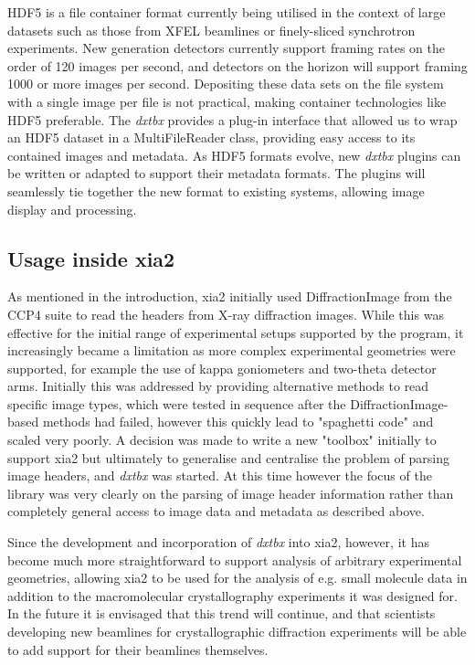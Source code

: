 \documentclass[preprint]{iucr}
\newcommand{\dxtbx}{\emph{dxtbx}\xspace}
\begin{document}
HDF5 is a file container format currently being utilised in the context of large 
datasets such as those from XFEL beamlines or finely-sliced synchrotron 
experiments. New generation detectors currently support framing rates on the 
order of 120 images per second, and detectors on the horizon will support 
framing 1000 or more images per second. Depositing these data sets on the file 
system with a single image per file is not practical, making container 
technologies like HDF5 preferable. The \dxtbx provides a plug-in interface that 
allowed us to wrap an HDF5 dataset in a MultiFileReader class, providing easy 
access to its contained images and metadata. As HDF5 formats evolve, new \dxtbx 
plugins can be written or adapted to support their metadata formats. The 
plugins will seamlessly tie together the new format to existing systems, 
allowing image display and processing.

\subsection{Usage inside xia2}
 
As mentioned in the introduction, xia2 initially used DiffractionImage from the 
CCP4 suite to read the headers from X-ray diffraction images. While this was 
effective for the initial range of experimental setups supported by the program, 
it increasingly became a limitation as more complex experimental geometries were 
supported, for example the use of kappa goniometers and two-theta detector arms. 
Initially this was addressed by providing alternative methods to read specific 
image types, which were tested in sequence after the DiffractionImage-based 
methods had failed, however this quickly lead to "spaghetti code" and scaled 
very poorly. A decision was made to write a new "toolbox" initially to support 
xia2 but ultimately to generalise and centralise the problem of parsing image 
headers, and \dxtbx was started. At this time however the focus of the library 
was very clearly on the parsing of image header information rather than 
completely general access to image data and metadata as described above.

Since the development and incorporation of \dxtbx into xia2, however, it has 
become much more straightforward to support analysis of arbitrary experimental 
geometries, allowing xia2 to be used for the analysis of e.g. small molecule 
data in addition to the macromolecular crystallography experiments it was 
designed for. In the future it is envisaged that this trend will continue, and 
that scientists developing new beamlines for crystallographic diffraction 
experiments will be able to add support for their beamlines themselves.
\end{document}
